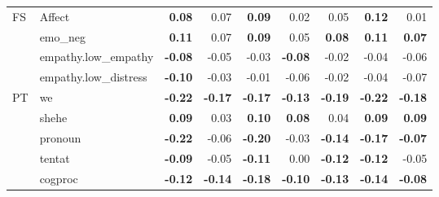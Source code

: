 \begin{table*}[ht]
{\begin{tabular}{llr|rrr|rrr}
 
 \hline
FS & Affect & \textbf{0.08} & 0.07 & \textbf{0.09} & 0.02 & 0.05 & \textbf{0.12} & 0.01\\
 & emo\_neg & \textbf{0.11} & 0.07 & \textbf{0.09} & 0.05 & \textbf{0.08} & \textbf{0.11} & \textbf{0.07}\\
 & empathy.low\_empathy & \textbf{-0.08} & -0.05 & -0.03 & \textbf{-0.08} & -0.02 & -0.04 & -0.06\\
 & empathy.low\_distress & \textbf{-0.10} & -0.03 & -0.01 & -0.06 & -0.02 & -0.04 & -0.07\\
\hline
PT & we & \textbf{-0.22} & \textbf{-0.17} & \textbf{-0.17} & \textbf{-0.13} & \textbf{-0.19} & \textbf{-0.22} & \textbf{-0.18}\\
 & shehe & \textbf{0.09} & 0.03 & \textbf{0.10} & \textbf{0.08} & 0.04 & \textbf{0.09} & \textbf{0.09}\\
 & pronoun & \textbf{-0.22} & -0.06 & \textbf{-0.20} & -0.03 & \textbf{-0.14} & \textbf{-0.17} & \textbf{-0.07}\\
 & tentat & \textbf{-0.09} & -0.05 & \textbf{-0.11} & 0.00 & \textbf{-0.12} & \textbf{-0.12} & -0.05\\
 & cogproc & \textbf{-0.12} & \textbf{-0.14} & \textbf{-0.18} & \textbf{-0.10} & \textbf{-0.13} & \textbf{-0.14} & \textbf{-0.08}\\
\bottomrule
\end{tabular}}
\label{tab:complete-table-empathy}
\end{table*}

